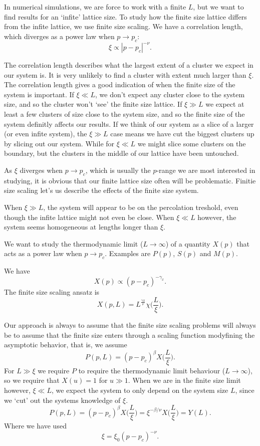 \documentclass[a4paper, 11pt, notitlepage, english]{article}
\begin{document}
In numerical simulations, we are force to work with a finite $L$, but we want to find results for an `infite' lattice size. To study how the finite size lattice differs from the infite lattice, we use finite size scaling. We have a correlation length, which diverges as a power law when $p \to p_c$:
$$\xi \propto |p-p_c|^{-\nu}.$$

The correlation length describes what the largest extent of a cluster we expect in our system is. It is very unlikely to find a cluster with extent much larger than $\xi$. The correlation length gives a good indication of when the finite size of the system is important. If $\xi \ll L$, we don't expect any cluster close to the system size, and so the cluster won't `see' the finite size lattice. If $\xi \gg L$ we expect at least a few clusters of size close to the system size, and so the finite size of the system definitly affects our results. If we think of our system as a slice of a larger (or even infite system), the $\xi \gg L$ case means we have cut the biggest clusters up by slicing out our system. While for $\xi \ll L$ we might slice some clusters on the boundary, but the clusters in the middle of our lattice have been untouched.

As $\xi$ diverges when $p \to p_c$, which is usually the $p$-range we are most interested in studying, it is obvious that our finite lattice size often will be problematic. Finitie size scaling let's us describe the effects of the finite size system.


When $\xi \gg L$, the system will appear to be on the percolation treshold, even though the infite lattice might not even be close. When $\xi \ll L$ however, the system seems homogeneous at lengths longer than $\xi$.

We want to study the thermodynamic limit ($L\to \infty$) of a quantity $X(p)$ that acts as a power law when $p\to p_c$. Examples are $P(p)$, $S(p)$ and $M(p)$.

We have
$$X(p) \propto (p-p_c)^{-\gamma_x}.$$
The finite size scaling ansatz is
$$X(p, L) = L^{\frac{\gamma x}{\nu}} \chi \bigg(\frac{L}{\xi}\bigg).$$

Our approach is always to assume that the finite size scaling problems will always be to assume that the finite size enters through a scaling function modyfining the asymptotic behavior, that is, we assume
$$P(p, L) = (p-p_c)^\beta X\bigg(\frac{L}{\xi}\bigg).$$
For $L \gg \xi$ we require $P$ to require the thermodynamic limit behaviour ($L\to \infty$), so we require that $X(u) = 1$ for $u \gg 1$. When we are in the finite size limit however, $\xi \ll L$, we expect the system to only depend on the system size $L$, since we `cut' out the systems knowledge of $\xi$.
$$P(p, L) = (p - p_c)^\beta X \bigg(\frac{L}{\xi}\bigg) = \xi^{-\beta / \nu} X\bigg(\frac{L}{\xi}\bigg) = Y(L).$$
Where we have used 
$$\xi = \xi_0(p-p_c)^{-\nu}.$$
\end{document}
